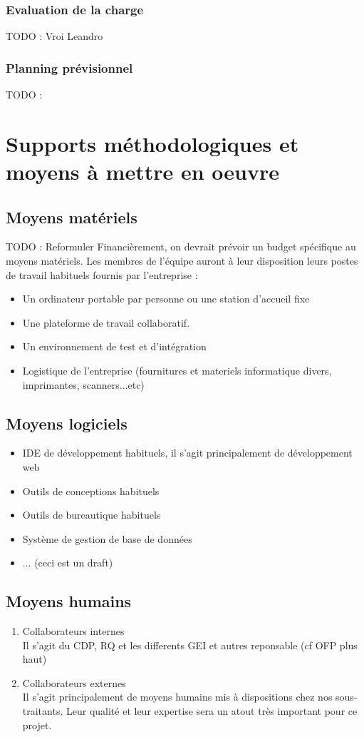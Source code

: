 \subsubsection{Evaluation de la charge}
TODO : Vroi Leandro
\subsubsection{Planning prévisionnel}

TODO :

\section{Supports méthodologiques et moyens à mettre en oeuvre}
\subsection{Moyens matériels}
TODO : Reformuler
Financièrement, on devrait prévoir un budget spécifique au moyens matériels.
Les membres de l'équipe auront à leur disposition leurs postes de travail habituels fournis par l'entreprise :
\begin{itemize}
\item Un ordinateur portable par personne ou une station d'accueil fixe
\item Une plateforme de travail collaboratif.
\item Un environnement de test et d'intégration
\item Logistique de l'entreprise (fournitures et materiels informatique divers, imprimantes, scanners...etc)
\end{itemize}
 
\subsection{Moyens logiciels}
\begin{itemize}
\item IDE de développement habituels, il s'agit principalement de développement web
\item Outils de conceptions habituels
\item Outils de bureautique habituels
\item Système de gestion de base de données
\item ... (ceci est un draft)
\end{itemize}

\subsection{Moyens humains}
\begin{enumerate}
\item Collaborateurs internes\\
Il s'agit du CDP, RQ et les differents GEI et autres reponsable (cf OFP plus haut)

\item Collaborateurs externes\\
Il s'agit principalement de moyens humains mis à dispositions chez nos sous-traitants. Leur qualité et leur expertise sera un atout très
important pour ce projet.
\end{enumerate}
 
